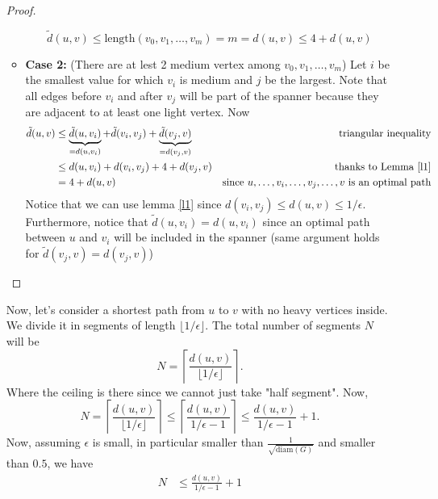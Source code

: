 \documentclass[11pt]{article}
\begin{document}
\begin{enumerate}
\begin{proof}
\begin{itemize}
            \begin{equation*}
                \tilde d(u,v) \leq \text{length}(v_0,v_1,\dots,v_m) = m = d(u,v) \leq 4 + d(u,v)
            \end{equation*}
            \item \textbf{Case 2:} (There are at lest 2 medium vertex among $v_0,v_1,\dots,v_m$) 
            Let $i$ be the smallest value for which $v_i$ is medium and $j$ be the largest. Note that all edges before $v_i$ and after $v_j$ will be part of the spanner because they are adjacent to at least one light vertex. Now
            \begin{align*}
                \tilde d(u,v) &\leq  \underbrace{\tilde d(u,v_i)}_{= d(u,v_i)} + \tilde d(v_i,v_j) + \underbrace{\tilde d(v_j,v)}_{= d(v_j,v)} & \text{triangular inequality}\\
                &\leq d(u,v_i) + d(v_i,v_j) + 4 + d(v_j,v) & \text{thanks to Lemma \ref{l1}}\\
                &= 4 + d(u,v) & \text{since $u,\dots, v_i, \dots, v_j, \dots, v$ is an optimal path}
            \end{align*}
            Notice that we can use lemma \ref{l1} since $d(v_i,v_j) \leq d(u,v)\leq 1/\epsilon$. Furthermore, notice that $\tilde d(u,v_i) = d(u,v_i)$ since an optimal path between $u$ and $v_i$ will be included in the spanner (same argument holds for $\tilde d(v_j,v) = d(v_j,v)$)
        \end{itemize}
    \end{proof}
    Now, let's consider a shortest path from $u$ to $v$ with no heavy vertices inside. We divide it in segments of length $\lfloor 1/\epsilon \rfloor$. The total number of segments $N$ will be 
    \begin{equation*}
        N = \left\lceil\frac{d(u,v)}{\lfloor 1/\epsilon \rfloor}\right\rceil.
    \end{equation*}
    Where the ceiling is there since we cannot just take "half segment". Now,
    \begin{equation*}
        N =\left\lceil\frac{d(u,v)}{\lfloor 1/\epsilon \rfloor}\right\rceil \leq \left\lceil\frac{d(u,v)}{1/\epsilon - 1}\right\rceil \leq \frac{d(u,v)}{1/\epsilon - 1} + 1.
    \end{equation*}
    Now, assuming $\epsilon$ is small, in particular smaller than $\frac{1}{\sqrt{\text{diam}(G)}}$ and smaller than $0.5$, we have
    \begin{align*}
        N &\leq \frac{d(u,v)}{1/\epsilon - 1} + 1\\

\end{align*}
\end{enumerate}
\end{document}
